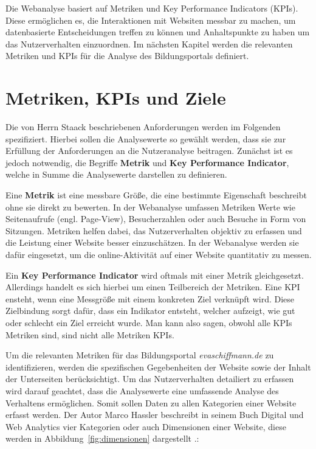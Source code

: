 Die Webanalyse basiert auf Metriken und Key Performance Indicators (KPIs). Diese ermöglichen es, die Interaktionen mit Websiten messbar zu machen, um datenbasierte Entscheidungen treffen zu können und Anhaltspunkte zu haben um das Nutzerverhalten einzuordnen. Im nächsten Kapitel werden die relevanten Metriken und KPIs für die Analyse des Bildungsportals definiert.

\section{Metriken, KPIs und Ziele} %
\label{sec:kpis}
Die von Herrn Staack beschriebenen Anforderungen werden im Folgenden spezifiziert. Hierbei sollen die Analysewerte so gewählt werden, dass sie zur Erfüllung der Anforderungen an die Nutzeranalyse beitragen. Zunächst ist es jedoch notwendig, die Begriffe \textbf{Metrik} und \textbf{Key Performance Indicator}, welche in Summe die Analysewerte darstellen zu definieren.

Eine \textbf{Metrik} ist eine messbare Größe, die eine bestimmte Eigenschaft beschreibt ohne sie direkt zu bewerten. In der Webanalyse umfassen Metriken Werte wie Seitenaufrufe (engl. Page-View), Besucherzahlen oder auch Besuche in Form von Sitzungen. Metriken helfen dabei, das Nutzerverhalten objektiv zu erfassen und die Leistung einer Website besser einzuschätzen. In der Webanalyse werden sie dafür eingesetzt, um die online-Aktivität auf einer Website quantitativ zu messen. \parencite[Kap.5.1]{Hassler2019} \parencite[S.26]{Dykes2014}

Ein \textbf{Key Performance Indicator} wird oftmals mit einer Metrik gleichgesetzt. Allerdings handelt es sich hierbei um einen Teilbereich der Metriken. Eine KPI ensteht, wenn eine Messgröße mit einem konkreten Ziel verknüpft wird. Diese Zielbindung sorgt dafür, dass ein Indikator entsteht, welcher aufzeigt, wie gut oder schlecht ein Ziel erreicht wurde. Man kann also sagen, obwohl alle KPIs Metriken sind, sind nicht alle Metriken KPIs. \parencite[S.9-13]{Lammenett2019} \parencite[S.46]{Dykes2014}

Um die relevanten Metriken für das Bildungsportal \textit{evaschiffmann.de} zu identifizieren, werden die spezifischen Gegebenheiten der Website sowie der Inhalt der Unterseiten berücksichtigt. Um das Nutzerverhalten detailiert zu erfassen wird darauf geachtet, dass die Analysewerte eine umfassende Analyse des Verhaltens ermöglichen. Somit sollen Daten zu allen Kategorien einer Website erfasst werden. Der Autor Marco Hassler beschreibt in seinem Buch \glqq Digital und Web Analytics\grqq{} vier Kategorien oder auch Dimensionen einer Website, diese werden in Abbildung~\ref{fig:dimensionen} dargestellt \parencite[Kap.5.7]{Hassler2019}.: 

